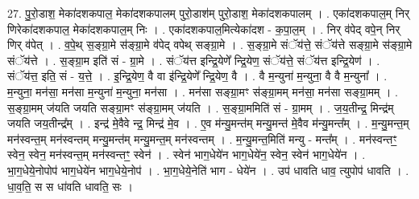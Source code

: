 \documentclass[17pt]{extarticle}
\begin{document}
27. पु॒रो॒डाश॒ मेका॑दशकपाल॒ मेका॑दशकपालम् पुरो॒डाश॑म् पुरो॒डाश॒ मेका॑दशकपालम् । . एका॑दशकपाल॒म् निर् णिरेका॑दशकपाल॒ मेका॑दशकपाल॒म् निः । . एका॑दशकपाल॒मित्येका॑दश - क॒पा॒ल॒म् । . निर् व॑पेद् वपे॒न् निर् णिर् व॑पेत् । . व॒पे॒थ् स॒ङ्ग्रा॒मे स॑ङ्ग्रा॒मे व॑पेद् वपेथ् सङ्ग्रा॒मे । . स॒ङ्ग्रा॒मे संॅय॑त्ते॒ संॅय॑त्ते सङ्ग्रा॒मे स॑ङ्ग्रा॒मे संॅय॑त्ते । . स॒ङ्ग्रा॒म इति॑ सं - ग्रा॒मे । . संॅय॑त्त इन्द्रि॒येणे᳚ न्द्रि॒येण॒ संॅय॑त्ते॒ संॅय॑त्त इन्द्रि॒येण॑ । . संॅय॑त्त॒ इति॒ सं - य॒त्ते॒ । . इ॒न्द्रि॒येण॒ वै वा इ॑न्द्रि॒येणे᳚ न्द्रि॒येण॒ वै । . वै म॒न्युना॑ म॒न्युना॒ वै वै म॒न्युना᳚ । . म॒न्युना॒ मन॑सा॒ मन॑सा म॒न्युना॑ म॒न्युना॒ मन॑सा । . मन॑सा सङ्ग्रा॒मꣳ स॑ङ्ग्रा॒मम् मन॑सा॒ मन॑सा सङ्ग्रा॒मम् । . स॒ङ्ग्रा॒मम् ज॑यति जयति सङ्ग्रा॒मꣳ स॑ङ्ग्रा॒मम् ज॑यति । . स॒ङ्ग्रा॒ममिति॑ सं - ग्रा॒मम् । . ज॒य॒तीन्द्र॒ मिन्द्र॑म् जयति जय॒तीन्द्र᳚म् । . इन्द्र॑ मे॒वैवे न्द्र॒ मिन्द्र॑ मे॒व । . ए॒व म॑न्यु॒मन्त॑म् मन्यु॒मन्त॑ मे॒वैव म॑न्यु॒मन्त᳚म् । . म॒न्यु॒मन्त॒म् मन॑स्वन्त॒म् मन॑स्वन्तम् मन्यु॒मन्त॑म् मन्यु॒मन्त॒म् मन॑स्वन्तम् । . म॒न्यु॒मन्त॒मिति॑ मन्यु - मन्त᳚म् । . मन॑स्वन्तꣳ॒॒ स्वेन॒ स्वेन॒ मन॑स्वन्त॒म् मन॑स्वन्तꣳ॒॒ स्वेन॑ । . स्वेन॑ भाग॒धेये॑न भाग॒धेये॑न॒ स्वेन॒ स्वेन॑ भाग॒धेये॑न । . भा॒ग॒धेये॒नोपोप॑ भाग॒धेये॑न भाग॒धेये॒नोप॑ । . भा॒ग॒धेये॒नेति॑ भाग - धेये॑न । . उप॑ धावति धाव॒ त्युपोप॑ धावति । . धा॒व॒ति॒ स स धा॑वति धावति॒ सः । \newline
\end{document}
